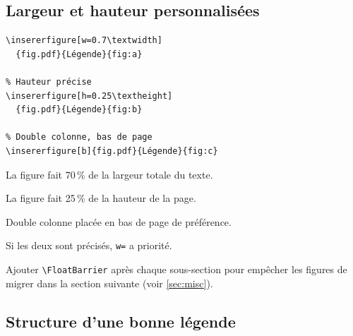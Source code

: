 \documentclass[12pt, a4paper]{article}
\begin{document}
\newpage

\subsection{Largeur et hauteur personnalisées}

\begin{demo}
\begin{lstlisting}[style=latexcode]
% Largeur précise
\insererfigure[w=0.7\textwidth]
  {fig.pdf}{Légende}{fig:a}

% Hauteur précise
\insererfigure[h=0.25\textheight]
  {fig.pdf}{Légende}{fig:b}

% Double colonne, bas de page
\insererfigure[b]{fig.pdf}{Légende}{fig:c}
\end{lstlisting}
\tcblower
\footnotesize
\begin{description}[noitemsep]
  \item[\texttt{w=0.7\textbackslash textwidth}] La figure fait 70\,\% de la largeur totale du texte.
  \item[\texttt{h=0.25\textbackslash textheight}] La figure fait 25\,\% de la hauteur de la page.
  \item[\texttt{b}] Double colonne placée en bas de page de préférence.
  \item[\texttt{w=} et \texttt{h=}] Si les deux sont précisés, \texttt{w=} a priorité.
\end{description}
\end{demo}

\begin{astuce}
  Ajouter \verb|\FloatBarrier| après chaque sous-section pour empêcher les figures de migrer dans la section suivante (voir \autoref{sec:misc}).
\end{astuce}

\subsection{Structure d'une bonne légende}
\end{document}
